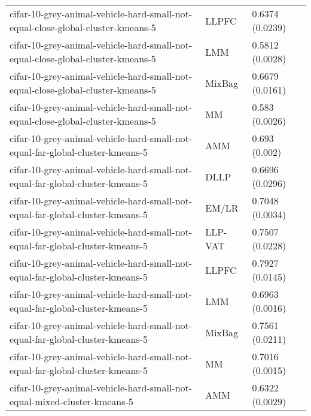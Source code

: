 \begin{longtable}{lll}
                              cifar-10-grey-animal-vehicle-hard-small-not-equal-close-global-cluster-kmeans-5 &     LLPFC &                           0.6374 (0.0239) \\
                              cifar-10-grey-animal-vehicle-hard-small-not-equal-close-global-cluster-kmeans-5 &       LMM &                           0.5812 (0.0028) \\
                              cifar-10-grey-animal-vehicle-hard-small-not-equal-close-global-cluster-kmeans-5 &    MixBag &                           0.6679 (0.0161) \\
                              cifar-10-grey-animal-vehicle-hard-small-not-equal-close-global-cluster-kmeans-5 &        MM &                            0.583 (0.0026) \\
                                cifar-10-grey-animal-vehicle-hard-small-not-equal-far-global-cluster-kmeans-5 &       AMM &                             0.693 (0.002) \\
                                cifar-10-grey-animal-vehicle-hard-small-not-equal-far-global-cluster-kmeans-5 &      DLLP &                           0.6696 (0.0296) \\
                                cifar-10-grey-animal-vehicle-hard-small-not-equal-far-global-cluster-kmeans-5 &     EM/LR &                           0.7048 (0.0034) \\
                                cifar-10-grey-animal-vehicle-hard-small-not-equal-far-global-cluster-kmeans-5 &   LLP-VAT &                           0.7507 (0.0228) \\
                                cifar-10-grey-animal-vehicle-hard-small-not-equal-far-global-cluster-kmeans-5 &     LLPFC &                           0.7927 (0.0145) \\
                                cifar-10-grey-animal-vehicle-hard-small-not-equal-far-global-cluster-kmeans-5 &       LMM &                           0.6963 (0.0016) \\
                                cifar-10-grey-animal-vehicle-hard-small-not-equal-far-global-cluster-kmeans-5 &    MixBag &                           0.7561 (0.0211) \\
                                cifar-10-grey-animal-vehicle-hard-small-not-equal-far-global-cluster-kmeans-5 &        MM &                           0.7016 (0.0015) \\
                                     cifar-10-grey-animal-vehicle-hard-small-not-equal-mixed-cluster-kmeans-5 &       AMM &                           0.6322 (0.0029) \\

\end{longtable}
